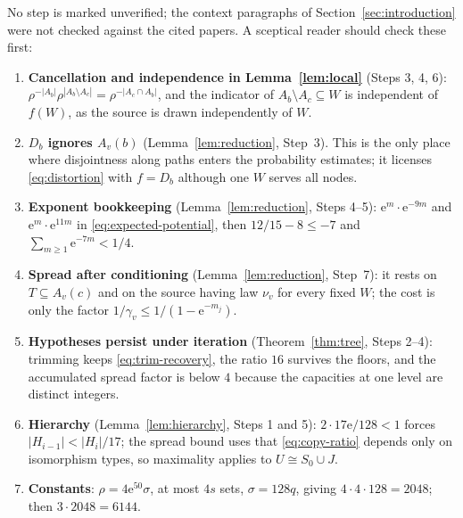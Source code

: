 \documentclass[11pt]{article}
\numberwithin{equation}{section}
\newcommand{\ee}{\mathrm e}
\begin{document}
No step is marked unverified; the context paragraphs of
Section~\ref{sec:introduction} were not checked against the cited
papers. A sceptical reader should check these first:
\begin{enumerate}[itemsep=2pt,topsep=3pt]
 \item \textbf{Cancellation and independence in Lemma~\ref{lem:local}}
 (Steps 3, 4, 6): $\rho^{-|A_b|}\rho^{|A_b\setminus A_c|}
 =\rho^{-|A_c\cap A_b|}$, and the indicator of
 $A_b\setminus A_c\subseteq W$ is independent of $f(W)$, as the source is drawn independently of $W$.
 \item \textbf{$D_b$ ignores $A_v(b)$} (Lemma~\ref{lem:reduction},
 Step~3). This is the only place where disjointness along paths enters
 the probability estimates; it licenses \eqref{eq:distortion} with
 $f=D_b$ although one $W$ serves all nodes.
 \item \textbf{Exponent bookkeeping} (Lemma~\ref{lem:reduction}, Steps
 4--5): $\ee^{m}\cdot\ee^{-9m}$ and $\ee^{m}\cdot\ee^{11m}$ in
 \eqref{eq:expected-potential}, then $12/15-8\le-7$ and
 $\sum_{m\ge1}\ee^{-7m}<1/4$.
 \item \textbf{Spread after conditioning} (Lemma~\ref{lem:reduction},
 Step~7): it rests on $T\subseteq A_v(c)$ and on the source having law
 $\nu_v$ for every fixed $W$; the cost is only the factor
 $1/\gamma_v\le1/(1-\ee^{-m_j})$.
 \item \textbf{Hypotheses persist under iteration}
 (Theorem~\ref{thm:tree}, Steps 2--4): trimming keeps
 \eqref{eq:trim-recovery}, the ratio $16$ survives the floors, and the
 accumulated spread factor is below $4$ because the capacities at one
 level are distinct integers.
 \item \textbf{Hierarchy} (Lemma~\ref{lem:hierarchy}, Steps 1 and 5):
 $2\cdot17\ee/128<1$ forces $|H_{i-1}|<|H_i|/17$; the spread bound uses
 that \eqref{eq:copy-ratio} depends only on isomorphism types, so
 maximality applies to $U\cong S_0\cup J$.
 \item \textbf{Constants}: $\rho=4\ee^{50}\sigma$, at most $4s$ sets,
 $\sigma=128q$, giving $4\cdot4\cdot128=2048$; then $3\cdot2048=6144$.
\end{enumerate}
\end{document}
